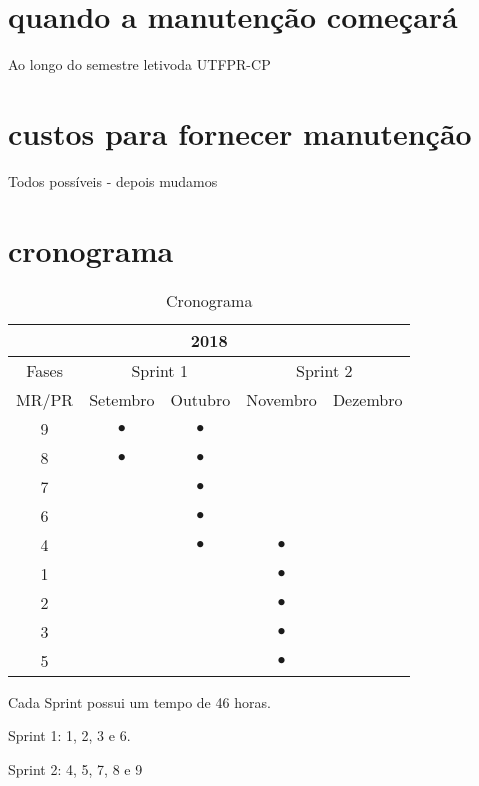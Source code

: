 \section{quando a manutenção começará}
Ao longo do semestre letivoda UTFPR-CP
\section{custos para fornecer manutenção}
Todos possíveis - depois mudamos
\section{cronograma}
\begin{table}[!htb]
  \caption{Cronograma}
  \label{tab:cronograma}
  \begin{center}
	  \begin{tabular}{c||c|c|c|c}
	    \multicolumn{5}{c}{2018} \\ \hline \hline
			\multicolumn{1}{c||}{Fases} &
	    \multicolumn{2}{c|}{Sprint 1} &
	    \multicolumn{2}{|c}{Sprint 2} \\ \hline \hline
	    {MR/PR}  &  Setembro & Outubro  & Novembro & Dezembro  \\ \hline
	    9       & $\bullet$ & $\bullet$&          &           \\
	    8       & $\bullet$ & $\bullet$&          &           \\
	    7       &           & $\bullet$& 				 	&           \\
			6       &           & $\bullet$&          &           \\
			4       &           & $\bullet$& $\bullet$&           \\
	    1       &           &          & $\bullet$&					 \\
	    2       &           &          & $\bullet$& 					 \\
			3       &           &          & $\bullet$&           \\
			5       &           &          & $\bullet$&          	\\
	  \end{tabular}
	  \end{center}
\end{table}

Cada Sprint possui um tempo de 46 horas.

Sprint 1: 1, 2, 3 e 6.

Sprint 2:  4, 5, 7, 8 e 9
